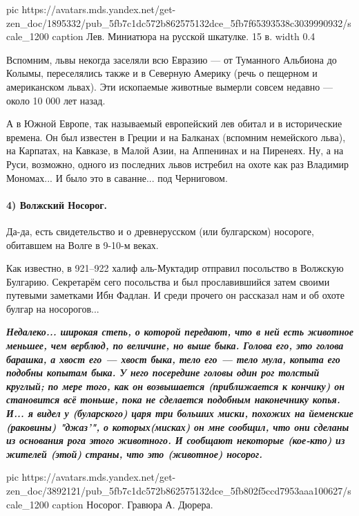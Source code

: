 \ifcmt
  pic https://avatars.mds.yandex.net/get-zen_doc/1895332/pub_5fb7c1dc572b862575132dce_5fb7f65393538c3039990932/scale_1200
	caption Лев. Миниатюра на русской шкатулке. 15 в.
	width 0.4
\fi

Вспомним, львы некогда заселяли всю Евразию — от Туманного Альбиона до Колымы,
переселялись также и в Северную Америку (речь о пещерном и американском львах).
Эти ископаемые животные вымерли совсем недавно — около 10 000 лет назад.

А в Южной Европе, так называемый европейский лев обитал и в исторические
времена. Он был известен в Греции и на Балканах (вспомним немейского льва), на
Карпатах, на Кавказе, в Малой Азии, на Аппенинах и на Пиренеях. Ну, а на Руси,
возможно, одного из последних львов истребил на охоте как раз Владимир
Мономах... И было это в саванне... под Черниговом.

\paragraph{4) Волжский Носорог.}

Да-да, есть свидетельство и о древнерусском (или булгарском) носороге,
обитавшем на Волге в 9-10-м веках.

Как известно, в 921–922 халиф аль-Муктадир отправил посольство в Волжскую
Булгарию. Секретарём сего посольства и был прославившийся затем своими путевыми
заметками Ибн Фадлан. И среди прочего он рассказал нам и об охоте булгар на
носорогов...

\begin{leftbar}
  \begingroup
    \em\large\bfseries\color{blue}
				Недалеко... широкая степь, о которой передают, что в ней есть животное
				меньшее, чем верблюд, по величине, но выше быка. Голова его, это голова
				барашка, а хвост его — хвост быка, тело его — тело мула, копыта его
				подобны копытам быка. У него посередине головы один рог толстый
				круглый; по мере того, как он возвышается (приближается к кончику) он
				становится всё тоньше, пока не сделается подобным наконечнику копья.
				И... я видел у (буларского) царя три больших миски, похожих на
				йеменские (раковины) "джаз'", о которых(мисках) он мне сообщил, что они
				сделаны из основания рога этого животного. И сообщают некоторые
				(кое-кто) из жителей (этой) страны, что это (животное) носорог.
  \endgroup
\end{leftbar}

\ifcmt
  pic https://avatars.mds.yandex.net/get-zen_doc/3892121/pub_5fb7c1dc572b862575132dce_5fb802f5ccd7953aaa100627/scale_1200
	caption Носорог. Гравюра А. Дюрера. 
\fi

